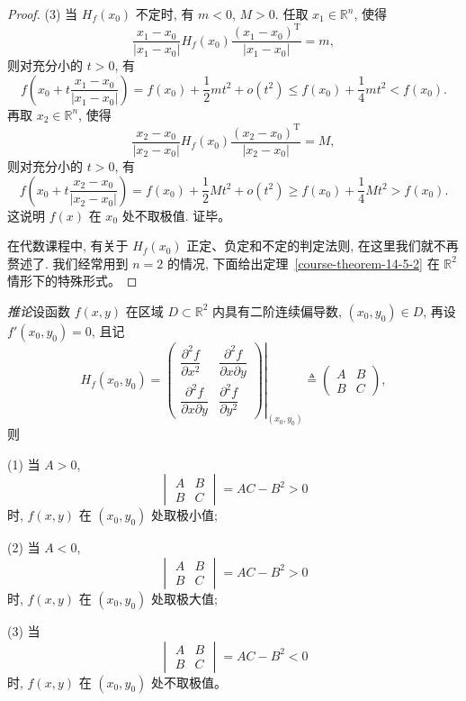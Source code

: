 \documentclass[UTF8,12pt,a4paper,fontset=fandol]{ctexart}
\begin{document}
\begin{proof}
\noindent (3) 当 $H_f(x_0)$ 不定时, 有 $m<0$, $M>0$. 任取 $x_1\in\mathbb R^n$, 使得
\[
  \frac{x_1-x_0}{|x_1-x_0|}
  H_f(x_0)
  \frac{(x_1-x_0)^{\mathrm T}}{|x_1-x_0|}
  =m,
\]
则对充分小的 $t>0$, 有
\[
  f\left(x_0+t\frac{x_1-x_0}{|x_1-x_0|}\right)
  =f(x_0)+\frac12mt^2+o(t^2)
  \leqslant f(x_0)+\frac14mt^2<f(x_0).
\]
再取 $x_2\in\mathbb R^n$, 使得
\[
  \frac{x_2-x_0}{|x_2-x_0|}
  H_f(x_0)
  \frac{(x_2-x_0)^{\mathrm T}}{|x_2-x_0|}
  =M,
\]
则对充分小的 $t>0$, 有
\[
  f\left(x_0+t\frac{x_2-x_0}{|x_2-x_0|}\right)
  =f(x_0)+\frac12Mt^2+o(t^2)
  \geqslant f(x_0)+\frac14Mt^2>f(x_0).
\]
这说明 $f(x)$ 在 $x_0$ 处不取极值. 证毕。

在代数课程中, 有关于 $H_f(x_0)$ 正定、负定和不定的判定法则, 在这里我们就不再赘述了. 我们经常用到 $n=2$ 的情况, 下面给出定理~\ref{course-theorem-14-5-2}  在 $\mathbb R^2$ 情形下的特殊形式。

\end{proof}
\noindent\emph{推论}\quad 设函数 $f(x,y)$ 在区域 $D\subset\mathbb R^2$ 内具有二阶连续偏导数, $(x_0,y_0)\in D$, 再设 $f'(x_0,y_0)=0$, 且记
\[
  H_f(x_0,y_0)
  =
  \left.
  \begin{pmatrix}
    \dfrac{\partial^2 f}{\partial x^2} &
    \dfrac{\partial^2 f}{\partial x\partial y}\\
    \dfrac{\partial^2 f}{\partial x\partial y} &
    \dfrac{\partial^2 f}{\partial y^2}
  \end{pmatrix}
  \right|_{(x_0,y_0)}
  \triangleq
  \begin{pmatrix}
    A & B\\
    B & C
  \end{pmatrix},
\]
则

\noindent (1) 当 $A>0$,
\[
  \begin{vmatrix}
    A & B\\
    B & C
  \end{vmatrix}
  =AC-B^2>0
\]
时, $f(x,y)$ 在 $(x_0,y_0)$ 处取极小值;

\noindent (2) 当 $A<0$,
\[
  \begin{vmatrix}
    A & B\\
    B & C
  \end{vmatrix}
  =AC-B^2>0
\]
时, $f(x,y)$ 在 $(x_0,y_0)$ 处取极大值;

\noindent (3) 当
\[
  \begin{vmatrix}
    A & B\\
    B & C
  \end{vmatrix}
  =AC-B^2<0
\]
时, $f(x,y)$ 在 $(x_0,y_0)$ 处不取极值。
\end{document}
